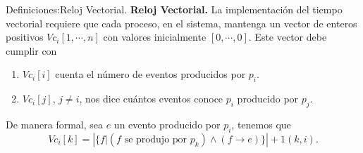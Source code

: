\begin{frame}[fragile]{Definiciones:}{Reloj Vectorial.}
    \justifying
    \textbf{Reloj Vectorial.} La implementación del tiempo
    vectorial requiere que cada proceso, en el sistema,
    mantenga un vector de enteros positivos $Vc_i[1, \dotsm, n]$
    con valores inicialmente $[0, \dotsm, 0]$. Este vector
    debe cumplir con
    \begin{enumerate}
    \item $Vc_i[i]$ cuenta el número de eventos producidos por
      $p_i$.
    \item $Vc_i[j]$, $j \not= i$, nos dice cuántos eventos conoce
      $p_i$ producido por $p_j$.
    \end{enumerate}
    De manera formal, sea $e$ un evento producido por $p_i$,
    tenemos que
    \[Vc_i[k] = \left|\{f | (f \text{ se produjo por } p_k) \land
    (f \rightarrow e)\}\right| + 1(k, i).\]
\end{frame}

